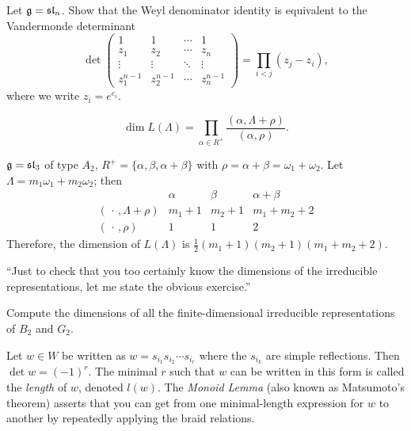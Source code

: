 \begin{exercise}
Let $\mathfrak{g} = \mathfrak{sl}_n$. Show that the Weyl denominator identity is equivalent to the
Vandermonde determinant
\[
  \det \begin{pmatrix}
    1 & 1 & \cdots & 1\\
    z_1 & z_2 & \cdots & z_n\\
    \vdots & \vdots & \ddots & \vdots\\
    z_1^{n-1} & z_2^{n-1} & \cdots & z_n^{n-1}
  \end{pmatrix} = \prod_{i<j} (z_j - z_i),
\]
where we write $z_i = e^{e_i}$.
\end{exercise}

\begin{corollary}
\[
  \dim L(\Lambda) = \prod_{\alpha \in R^+} \frac{(\alpha, \Lambda + \rho)}{(\alpha, \rho)}.
\]
\end{corollary}

\begin{example}
$\mathfrak{g} = \mathfrak{sl}_3$ of type $A_2$, $R^+ = \{\alpha, \beta, \alpha + \beta\}$ with
$\rho = \alpha + \beta = \omega_1 + \omega_2$. Let
$\Lambda = m_1\omega_1 + m_2\omega_2$; then
\[
  \begin{array}{c|c|c|c}
    & \alpha & \beta & \alpha + \beta\\ \hline
    (\,\cdot\,, \Lambda + \rho) & m_1 + 1 & m_2 + 1 & m_1 + m_2 + 2\\
    (\,\cdot\,, \rho) & 1 & 1 & 2
  \end{array}
\]
Therefore, the dimension of $L(\Lambda)$ is
$\frac12(m_1 + 1)(m_2 + 1)(m_1 + m_2 + 2)$.
\end{example}

``Just to check that you too certainly know the dimensions of the irreducible
representations, let me state the obvious exercise.''

\begin{exercise}
Compute the dimensions of all the finite-dimensional irreducible
representations of $B_2$ and $G_2$.
\end{exercise}


\begin{remark}
Let $w \in W$ be written as $w = s_{i_1}s_{i_2}\cdots s_{i_r}$ where the
$s_{i_k}$ are simple reflections. Then $\det w = (-1)^r$. The minimal $r$ such
that $w$ can be written in this form is called the \emph{length} of $w$,
denoted $l(w)$. The \emph{Monoid Lemma} (also known as Matsumoto's theorem)
asserts that you can get from one minimal-length expression for $w$ to
another by repeatedly applying the braid relations.
\end{remark}

